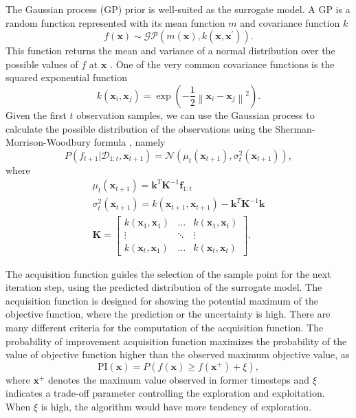 The Gaussian process (GP) prior is well-suited as the surrogate model. A GP is a random function represented with its mean function $m$ and covariance function $k$
\begin{equation}
    f(\mathbf{x}) \sim \mathcal{G} \mathcal{P}\left(m(\mathbf{x}), k\left(\mathbf{x}, \mathbf{x}^{\prime}\right)\right).
\end{equation}
This function returns the mean and variance of a normal distribution over the possible values of $f$ at $\mathbf{x}$ \cite{brochu2010tutorial}. One of the very common covariance functions is the squared exponential function
\begin{equation}
    k\left(\mathbf{x}_{i}, \mathbf{x}_{j}\right)=\exp \left(-\frac{1}{2}\left\|\mathbf{x}_{i}-\mathbf{x}_{j}\right\|^{2}\right).
\end{equation}
Given the first $t$ observation samples, we can use the Gaussian process to calculate the possible distribution of the observations using the Sherman-Morrison-Woodbury formula \cite{sherman1950adjustment}, namely
\begin{equation}
    P\left(f_{t+1} | \mathcal{D}_{1 : t}, \mathbf{x}_{t+1}\right)=\mathcal{N}\left(\mu_{t}\left(\mathbf{x}_{t+1}\right), \sigma_{t}^{2}\left(\mathbf{x}_{t+1}\right)\right),
\end{equation}
where
\begin{gather}
\mu_{t}\left(\mathbf{x}_{t+1}\right) =\mathbf{k}^{T} \mathbf{K}^{-1} \mathbf{f}_{1 : t} \\ 
\sigma_{t}^{2}\left(\mathbf{x}_{t+1}\right) =k\left(\mathbf{x}_{t+1}, \mathbf{x}_{t+1}\right)-\mathbf{k}^{T} \mathbf{K}^{-1} \mathbf{k}\\ \mathbf{K}=\left[\begin{array}{ccc}{k\left(\mathbf{x}_{1}, \mathbf{x}_{1}\right)} & {\dots} & {k\left(\mathbf{x}_{1}, \mathbf{x}_{t}\right)} \\ {\vdots} & {\ddots} & {\vdots} \\ {k\left(\mathbf{x}_{t}, \mathbf{x}_{1}\right)} & {\dots} & {k\left(\mathbf{x}_{t}, \mathbf{x}_{t}\right)}\end{array}\right].
\end{gather}

The acquisition function guides the selection of the sample point for the next iteration step, using the predicted distribution of the surrogate model. The acquisition function is designed for showing the potential maximum of the objective function, where the prediction or the uncertainty is high. There are many different criteria for the computation of the acquisition function. The probability of improvement acquisition function maximizes the probability of the value of objective function higher than the observed maximum objective value, as
\begin{equation}
    \mathrm{PI}(\mathbf{x}) =P\left(f(\mathbf{x}) \geq f\left(\mathbf{x}^{+}\right)+\xi\right),
\end{equation}
where $\mathbf{x}^{+}$ denotes the maximum value observed in former timesteps and $\xi$ indicates a trade-off parameter controlling the exploration and exploitation. When $\xi$ is high, the algorithm would have more tendency of exploration.

